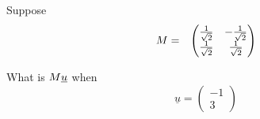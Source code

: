 \documentclass[10pt]{article}
\begin{document}
Suppose
\begin{eqnarray*}
\boldmath{M} &=& 
\begin{pmatrix}
\frac{1}{\sqrt 2} & -\frac{1}{\sqrt 2 } \\
\frac{1}{\sqrt 2} & \frac{1}{\sqrt 2}
\end{pmatrix}
\end{eqnarray*}

What is $\boldmath{M} \underline{u}$ when  
\begin{equation*}
\underline{u} = 
\begin{pmatrix}
-1 \\
3 
\end{pmatrix}
\end{equation*}
\end{document}
